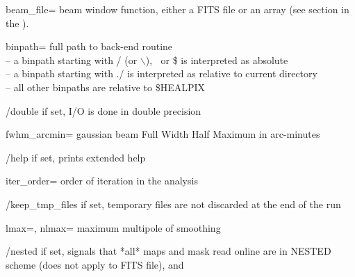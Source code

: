 \begin{keywords}
  \begin{kwlist}{} %
 \item[beam\_file=]  beam window function, either a FITS file or an array
		(see  section
		in the ). 

 \item[binpath=]  full path to back-end routine \\
              -- a binpath starting with / (or $\backslash$), $~$ or \$ is interpreted as absolute\\
              -- a binpath starting with ./ is interpreted as relative to current directory\\
              -- all other binpaths are relative to \$HEALPIX

 \item[/double]  if set, I/O is done in double precision 

 \item[fwhm\_arcmin=]  gaussian beam Full Width Half Maximum in arc-minutes 

 \item[/help]       if set, prints extended help

\item[iter\_order=]  order of iteration in the analysis 

\item[/keep\_tmp\_files]  if set, temporary files are not discarded at the end of the
                  run

 \item[lmax=, nlmax=]    maximum multipole of smoothing 

\item[/nested]  if set, signals that *all* maps and mask read online are in
   NESTED scheme (does not apply to FITS file), 
 and 


\end{kwlist}
\end{keywords}
